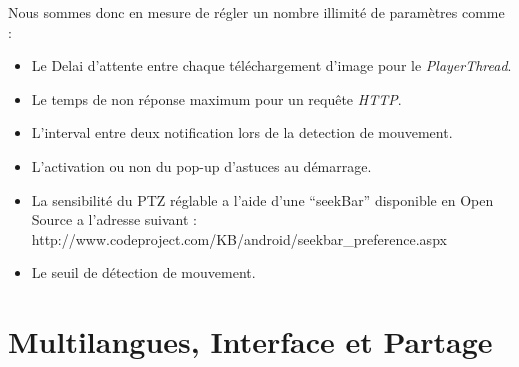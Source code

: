 \indent Nous sommes donc en mesure de régler un nombre illimité de paramètres comme :
\begin{itemize}
  \item Le Delai d'attente entre chaque téléchargement d'image pour le
  \textit{PlayerThread}.
  \item Le temps de non réponse maximum pour un requête \textit{HTTP}.
  \item L'interval entre deux notification lors de la detection de mouvement.
  \item L'activation ou non du pop-up d'astuces au démarrage.
  \item La sensibilité du PTZ réglable a l'aide d'une ``seekBar'' disponible
  en Open Source a l'adresse suivant :\newline
  http://www.codeproject.com/KB/android/seekbar\_preference.aspx
  \item Le seuil de détection de mouvement.
\end{itemize}

\section{Multilangues, Interface  et Partage}
